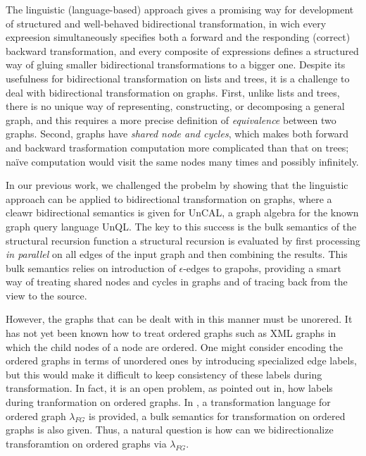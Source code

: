 \documentclass{llncs}
\begin{document}
The linguistic (language-based) approach\cite{Foster2005} gives a promising way for development of structured and well-behaved bidirectional transformation, in wich every expreesion simultaneously specifies both a forward and the responding (correct) backward transformation, and every composite of expressions defines a structured way of gluing smaller bidirectional transformations to a bigger one. Despite its usefulness for bidirectional transformation on lists and trees\cite{Foster2005,Bohannon2008,Matsuda2007,Hu2008,Voigtlander2009,Voigtlander2010,Wang2011}, it is a challenge to deal with bidirectional transformation on graphs. First, unlike lists and trees, there is no unique way of representing, constructing, or decomposing a general graph, and this requires a more precise definition of \emph{equivalence} between two graphs. Second, graphs have \emph{shared node and cycles}, which makes both forward and backward trasformation computation more complicated than that on trees; na\"{i}ve computation would visit the same nodes many times and possibly infinitely.

In our previous work\cite{Hidaka2010}, we challenged the probelm by showing that the linguistic approach can be applied to bidirectional transformation on graphs, where a cleawr bidirectional semantics is given for UnCAL, a graph algebra for the known graph query language UnQL\cite{Buneman2000}. The key to this success is the bulk semantics of the structural recursion function a structural recursion is evaluated by first processing \emph{in parallel} on all edges of the input graph and then combining the results. This bulk semantics relies on introduction of $\epsilon$-edges to grapohs, providing a smart way of treating shared nodes and cycles in graphs and of tracing back from the view to the source.

However, the graphs that can be dealt with in this manner must be unorered. It has not yet been known how to treat ordered graphs such as XML graphs in which the child nodes of a node are ordered. One might consider encoding the ordered graphs in terms of unordered ones by introducing specialized edge labels, but this would make it difficult to keep consistency of these labels during transformation. In fact, it is an open problem, as pointed out in\cite{Buneman2000}, how labels during tranformation on ordered graphs. In\cite{Hidaka2013} , a transformation language for ordered graph $\lambda_{FG}$ is provided, a bulk semantics for transformation on ordered graphs is also given. Thus, a natural question is how can we bidirectionalize transforamtion on ordered graphs via $\lambda_{FG}$.
\end{document}
